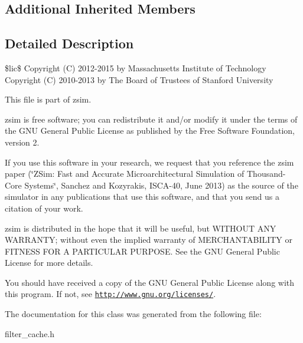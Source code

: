 \subsection*{Additional Inherited Members}


\subsection{Detailed Description}
\$lic\$ Copyright (C) 2012-\/2015 by Massachusetts Institute of Technology Copyright (C) 2010-\/2013 by The Board of Trustees of Stanford University

This file is part of zsim.

zsim is free software; you can redistribute it and/or modify it under the terms of the G\-N\-U General Public License as published by the Free Software Foundation, version 2.

If you use this software in your research, we request that you reference the zsim paper (\char`\"{}\-Z\-Sim\-: Fast and Accurate Microarchitectural Simulation of
\-Thousand-\/\-Core Systems\char`\"{}, Sanchez and Kozyrakis, I\-S\-C\-A-\/40, June 2013) as the source of the simulator in any publications that use this software, and that you send us a citation of your work.

zsim is distributed in the hope that it will be useful, but W\-I\-T\-H\-O\-U\-T A\-N\-Y W\-A\-R\-R\-A\-N\-T\-Y; without even the implied warranty of M\-E\-R\-C\-H\-A\-N\-T\-A\-B\-I\-L\-I\-T\-Y or F\-I\-T\-N\-E\-S\-S F\-O\-R A P\-A\-R\-T\-I\-C\-U\-L\-A\-R P\-U\-R\-P\-O\-S\-E. See the G\-N\-U General Public License for more details.

You should have received a copy of the G\-N\-U General Public License along with this program. If not, see \href{http://www.gnu.org/licenses/}{\tt http\-://www.\-gnu.\-org/licenses/}. 

The documentation for this class was generated from the following file\-:\begin{DoxyCompactItemize}
\item 
filter\-\_\-cache.\-h\end{DoxyCompactItemize}
